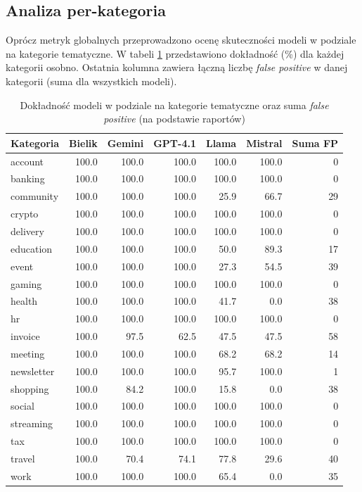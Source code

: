 \documentclass[12pt,a4paper,openright]{report}
\begin{document}
\subsection{Analiza per-kategoria}

Oprócz metryk globalnych przeprowadzono ocenę skuteczności modeli w podziale na kategorie tematyczne. W tabeli \ref{tab:per-category-accuracy} przedstawiono dokładność (\%) dla każdej kategorii osobno. Ostatnia kolumna zawiera łączną liczbę \textit{false positive} w danej kategorii (suma dla wszystkich modeli).

\begin{table}[H]
    \centering
    \scriptsize
    \begin{tabular}{l r r r r r r}
        \toprule
        Kategoria & Bielik & Gemini & GPT-4.1 & Llama & Mistral & Suma FP \\
        \midrule
        account & 100.0 & 100.0 & 100.0 & 100.0 & 100.0 & 0 \\
        banking & 100.0 & 100.0 & 100.0 & 100.0 & 100.0 & 0 \\
        community & 100.0 & 100.0 & 100.0 & 25.9 & 66.7 & 29 \\
        crypto & 100.0 & 100.0 & 100.0 & 100.0 & 100.0 & 0 \\
        delivery & 100.0 & 100.0 & 100.0 & 100.0 & 100.0 & 0 \\
        education & 100.0 & 100.0 & 100.0 & 50.0 & 89.3 & 17 \\
        event & 100.0 & 100.0 & 100.0 & 27.3 & 54.5 & 39 \\
        gaming & 100.0 & 100.0 & 100.0 & 100.0 & 100.0 & 0 \\
        health & 100.0 & 100.0 & 100.0 & 41.7 & 0.0 & 38 \\
        hr & 100.0 & 100.0 & 100.0 & 100.0 & 100.0 & 0 \\
        invoice & 100.0 & 97.5 & 62.5 & 47.5 & 47.5 & 58 \\
        meeting & 100.0 & 100.0 & 100.0 & 68.2 & 68.2 & 14 \\
        newsletter & 100.0 & 100.0 & 100.0 & 95.7 & 100.0 & 1 \\
        shopping & 100.0 & 84.2 & 100.0 & 15.8 & 0.0 & 38 \\
        social & 100.0 & 100.0 & 100.0 & 100.0 & 100.0 & 0 \\
        streaming & 100.0 & 100.0 & 100.0 & 100.0 & 100.0 & 0 \\
        tax & 100.0 & 100.0 & 100.0 & 100.0 & 100.0 & 0 \\
        travel & 100.0 & 70.4 & 74.1 & 77.8 & 29.6 & 40 \\
        work & 100.0 & 100.0 & 100.0 & 65.4 & 0.0 & 35 \\
        \bottomrule
    \end{tabular}
    \caption{Dokładność modeli w podziale na kategorie tematyczne oraz suma \textit{false positive} (na podstawie raportów)}
    \label{tab:per-category-accuracy}
\end{table}
\end{document}
